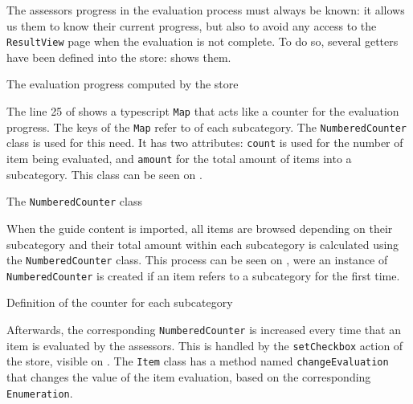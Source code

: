 The assessors progress in the evaluation process must always be known: it allows us them to know their current progress, but also to avoid any access to the \texttt{ResultView} page when the evaluation is not complete. To do so, several getters have been defined into the store:  shows them.

\begin{listing}[!ht] 
	\caption{The evaluation progress computed by the store}
	\label{lst:app_implementation_progress_store}
\end{listing}

The line 25 of  shows a \gls{typescript} \texttt{Map} that acts like a counter for the evaluation progress. The keys of the \texttt{Map} refer to  of each subcategory. The \texttt{NumberedCounter} class is used for this need. It has two attributes: \texttt{count} is used for the number of item being evaluated, and \texttt{amount} for the total amount of items into a subcategory. This class can be seen on .

\begin{listing}[!ht] 
	\caption{The \texttt{NumberedCounter} class}
	\label{lst:app_implementation_progress_counter}
\end{listing}

When the guide content is imported, all items are browsed depending on their subcategory and their total amount within each subcategory is calculated using the \texttt{NumberedCounter} class. This process can be seen on , were an instance of \texttt{NumberedCounter} is created if an item refers to a subcategory for the first time.

\begin{listing}[!ht] 
	\caption{Definition of the counter for each subcategory}
	\label{lst:app_implementation_progress_populate}
\end{listing}

Afterwards, the corresponding \texttt{NumberedCounter} is increased every time that an item is evaluated by the assessors. This is handled by the \texttt{setCheckbox} action of the store, visible on . The \texttt{Item} class has a method named \texttt{changeEvaluation} that changes the value of the item evaluation, based on the corresponding \texttt{Enumeration}.

